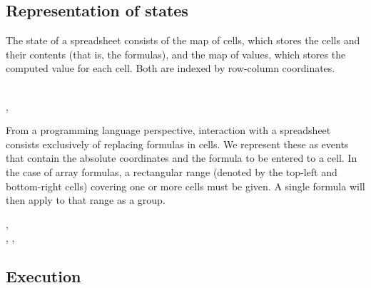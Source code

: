 \subsection{Representation of states}

The state of a spreadsheet consists of the map of cells, which stores the cells
and their contents (that is, the formulas), and the map of values, which
stores the computed value for each cell. Both are indexed by row-column coordinates.

\begin{hscode}\SaveRestoreHook
{}%
%
\>[B]{}\;\mathrel{=}\;\;\<[E]%
\\[\blanklineskip]%
\>[B]{}\;\mathrel{=}\;\llparenthesis \cdot , \cdot \rrparenthesis \;\<[E]%
\ColumnHook
\end{hscode}\resethooks

From a programming language perspective, interaction with a spreadsheet
consists exclusively of replacing formulas in cells. We represent these as
events that contain the absolute coordinates and the formula to be entered to
a cell. In the case of array formulas, a rectangular range (denoted by the
top-left and bottom-right cells) covering one or more cells must be given. A
single formula will then apply to that range as a group.

\begin{hscode}\SaveRestoreHook
{}%
%
%
%
%
%
%
\>[B]{}\;\<[15]%
\>[15]{}\mathrel{=}{}\<[15E]%
\>[18]{}\;{}\<[37]%
\>[37]{}\llparenthesis \cdot , \cdot \rrparenthesis \;\<[E]%
\\
\>[15]{}\mid {}\<[15E]%
\>[18]{}\;{}\<[37]%
\>[37]{}\llparenthesis \cdot , \cdot \rrparenthesis \;\llparenthesis \cdot , \cdot \rrparenthesis \;\<[E]%
\\
\>[B]{}\<[4]%
\>[4]{}\;\<[E]%
\ColumnHook
\end{hscode}\resethooks

\subsection{Execution}


